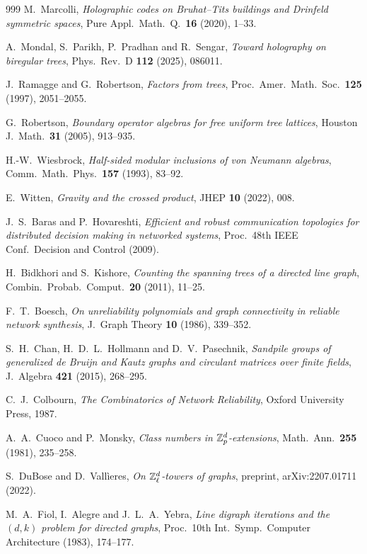 \begin{thebibliography}{999}
 M.~Marcolli, \emph{Holographic codes on Bruhat--Tits buildings and Drinfeld symmetric spaces}, Pure Appl.\ Math.\ Q.\ \textbf{16} (2020), 1--33.

 A.~Mondal, S.~Parikh, P.~Pradhan and R.~Sengar, \emph{Toward holography on biregular trees}, Phys.\ Rev.\ D \textbf{112} (2025), 086011.

 J.~Ramagge and G.~Robertson, \emph{Factors from trees}, Proc.\ Amer.\ Math.\ Soc.\ \textbf{125} (1997), 2051--2055.

 G.~Robertson, \emph{Boundary operator algebras for free uniform tree lattices}, Houston J.\ Math.\ \textbf{31} (2005), 913--935.

 H.-W.~Wiesbrock, \emph{Half-sided modular inclusions of von Neumann algebras}, Comm.\ Math.\ Phys.\ \textbf{157} (1993), 83--92.

 E.~Witten, \emph{Gravity and the crossed product}, JHEP \textbf{10} (2022), 008.

 J.~S.~Baras and P.~Hovareshti, \emph{Efficient and robust communication topologies for distributed decision making in networked systems}, Proc.\ 48th IEEE Conf.\ Decision and Control (2009).

 H.~Bidkhori and S.~Kishore, \emph{Counting the spanning trees of a directed line graph}, Combin.\ Probab.\ Comput.\ \textbf{20} (2011), 11--25.

 F.~T.~Boesch, \emph{On unreliability polynomials and graph connectivity in reliable network synthesis}, J.\ Graph Theory \textbf{10} (1986), 339--352.

 S.~H.~Chan, H.~D.~L.~Hollmann and D.~V.~Pasechnik, \emph{Sandpile groups of generalized de Bruijn and Kautz graphs and circulant matrices over finite fields}, J.\ Algebra \textbf{421} (2015), 268--295.

 C.~J.~Colbourn, \emph{The Combinatorics of Network Reliability}, Oxford University Press, 1987.

 A.~A.~Cuoco and P.~Monsky, \emph{Class numbers in $\mathbb{Z}_p^{d}$-extensions}, Math.\ Ann.\ \textbf{255} (1981), 235--258.

 S.~DuBose and D.~Vall\`ieres, \emph{On $\mathbb{Z}_\ell^{d}$-towers of graphs}, preprint, arXiv:2207.01711 (2022).

 M.~A.~Fiol, I.~Alegre and J.~L.~A.~Yebra, \emph{Line digraph iterations and the $(d,k)$ problem for directed graphs}, Proc.\ 10th Int.\ Symp.\ Computer Architecture (1983), 174--177.


\end{thebibliography}
